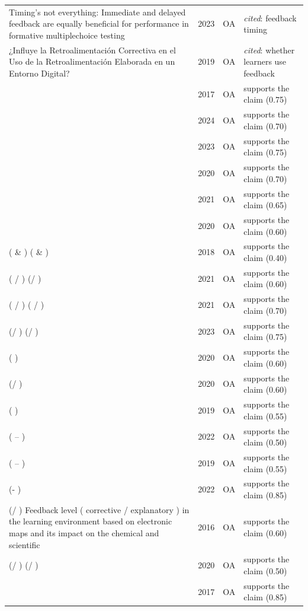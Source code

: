 \begin{longtable}{@{}%
  >{\raggedright\arraybackslash}p{}c%
  >{\raggedright\arraybackslash}p{}%
  >{\raggedright\arraybackslash}p{}@{}}
Timing's not everything: Immediate and delayed feedback are equally beneficial for performance in formative multiplechoice testing & 2023 & OA & \emph{cited}: feedback timing \\
¿Influye la Retroalimentación Correctiva en el Uso de la Retroalimentación Elaborada en un Entorno Digital? & 2019 & OA & \emph{cited}: whether learners use feedback \\
 & 2017 & OA & supports the claim (0.75) \\
  & 2024 & OA & supports the claim (0.70) \\
                & 2023 & OA & supports the claim (0.75) \\
                  & 2020 & OA & supports the claim (0.70) \\
                       & 2021 & OA & supports the claim (0.65) \\
                           & 2020 & OA & supports the claim (0.60) \\
     (  \&  )   (  \&  )                      & 2018 & OA & supports the claim (0.40) \\
     ( / )        (/ )           & 2021 & OA & supports the claim (0.60) \\
     ( / )     ( / )                & 2021 & OA & supports the claim (0.70) \\
     (/ )      (/ )           & 2023 & OA & supports the claim (0.75) \\
    ( )                    & 2020 & OA & supports the claim (0.60) \\
    (/ )        & 2020 & OA & supports the claim (0.60) \\
   ( )                         & 2019 & OA & supports the claim (0.55) \\
   ( --  )                       & 2022 & OA & supports the claim (0.50) \\
   ( -- )                     & 2019 & OA & supports the claim (0.55) \\
   (- )             & 2022 & OA & supports the claim (0.85) \\
   (/ )                       Feedback level ( corrective / explanatory ) in the learning environment based on electronic maps and its impact on the chemical and scientific & 2016 & OA & supports the claim (0.60) \\
   (/ )        (/ )            & 2020 & OA & supports the claim (0.50) \\
   4 & 2017 & OA & supports the claim (0.85) \\

\end{longtable}
